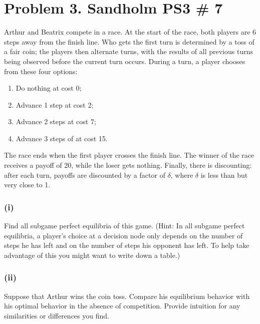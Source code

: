 \documentclass[10pt, a4paper]{article}
\begin{document}
\section*{Problem 3. Sandholm PS3 \# 7}
  Arthur and Beatrix compete in a race. At the start of the race, both players are 6 steps away from the finish line. Who gets the first turn is determined by a toss of a fair coin; the players then alternate turns, with the results of all previous turns being observed before the current turn occurs.
  During a turn, a player chooses from these four options:
  \begin{enumerate}
    \item Do nothing at cost 0;
    \item Advance 1 step at cost 2;
    \item Advance 2 steps at cost 7;
    \item Advance 3 steps of at cost 15.
  \end{enumerate}
  The race ends when the first player crosses the finish line. The winner of the race receives a payoff of 20, while the loser gets nothing. Finally, there is discounting: after each turn, payoffs are discounted by a factor of $\delta$, where $\delta$ is less than but very close to 1.
  \subsubsection*{(i)}
  Find all subgame perfect equilibria of this game. (Hint: In all subgame perfect equilibria, a player's choice at a decision node only depends on the number of steps he has left and on the number of steps his opponent has left. To help take advantage of this you might want to write down a table.)
  \subsubsection*{(ii)} 
  Suppose that Arthur wins the coin toss. Compare his equilibrium behavior with his optimal behavior in the absence of competition. Provide intuition for any similarities or differences you find.
\end{document}
